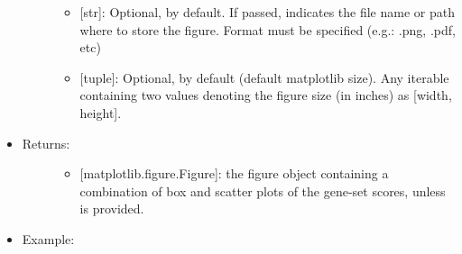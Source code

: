 \documentclass[letterpaper,10pt,english]{sphinxmanual}
\begin{document}
\begin{fulllineitems}
\begin{itemize}
\begin{description}
\begin{itemize}
\item {} 
 {[}str{]}: Optional,  by default. If passed,
indicates the file name or path where to store the figure.
Format must be specified (e.g.: .png, .pdf, etc)

\item {} 
 {[}tuple{]}: Optional,  by default (default
matplotlib size). Any iterable containing two values denoting
the figure size (in inches) as {[}width, height{]}.

\end{itemize}

\end{description}

\item {} \begin{description}
\item[{Returns:}] \leavevmode\begin{itemize}
\item {} 
{[}matplotlib.figure.Figure{]}: the figure object containing a
combination of box and scatter plots of the gene-set scores,
unless  is provided.

\end{itemize}

\end{description}

\item {} \begin{description}
\item[{Example:}] \leavevmode
\begin{sphinxVerbatim}[commandchars=\\\{\}]
  \PYG{p}{[}      \PYG{p}{]} 
\end{sphinxVerbatim}


\end{description}

\end{itemize}

\end{fulllineitems}
\end{document}

